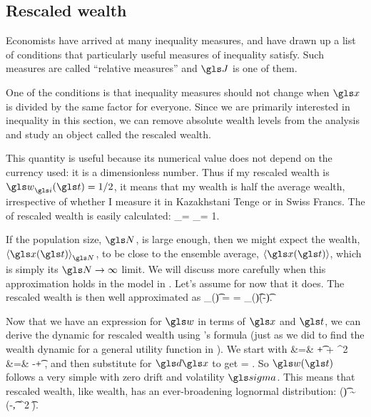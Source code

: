 
\subsection{Rescaled wealth}
Economists have arrived at many inequality measures, and have drawn up a list of conditions that particularly useful measures of inequality satisfy. Such measures are called ``relative measures'' \cite[Appendix 4]{Sen1997} and $\J$ is one of them.

One of the conditions is that inequality measures should not change when $\x$ is divided by the same factor for everyone. Since we are primarily interested in inequality in this section, we can remove absolute wealth levels from the analysis and study an object called the rescaled wealth.


This quantity is useful because its numerical value does not 
depend on the currency used: it is a dimensionless number. 
Thus if my rescaled wealth is $\gw_\gi(\t) = 1/2$, it means that my wealth is half the 
average wealth, irrespective of whether I measure it in Kazakhstani Tenge 
or in Swiss Francs. The \FEA of rescaled wealth is easily calculated:
\be
\ave{\gw_\gi(\t)}_\N = \ave{\frac{\x(\t)}{\ave{\x(\t)}_\N}}_\N = 1.
\ee

If the population size, $\N$, is large enough, then we might expect the \FEA wealth, $\ave{\x(\t)}_\N$, to be close to the ensemble average, $\ave{\x(\t)}$, which is simply its $\N\to\infty$ limit. We will discuss more carefully when this approximation holds in the \GBM model in . Let's assume for now that it does. The rescaled wealth is then well approximated as
\be
\gw_\gi(\t) = \frac{\x_\gi(\t)}{\ave{\x(\t)}} = \x_\gi(\t)\exp(-\gmu \t).
\ee

Now that we have an expression for $\gw$ in terms of $\x$ and $\t$, we can derive the dynamic for rescaled wealth using \Ito's formula (just as we did to find the wealth dynamic for a general utility function in ). We start with
\bea
\gd \gw &=& \frac{\partial \gw}{\partial \t}\gd\t + \frac{\partial \gw}{\partial \x}\gd\x +   \gd\x^2 \\
&=& -\gmu \gw\gd\t + \frac{\gw}{\x}\gd\x {},
\eea
and then substitute  for $\gd\x$ to get
\be
\gd \gw = \gw \gsigma \gd\gW.
\ee
So $\gw(\t)$ follows a very simple \GBM with zero drift and volatility $\gsigma$. This means that rescaled wealth, like wealth, has an ever-broadening lognormal distribution:
\be
\ln \gw(\t) \sim \mathcal{\N}\left(-\t, \gsigma^2 \t\right).
\ee

